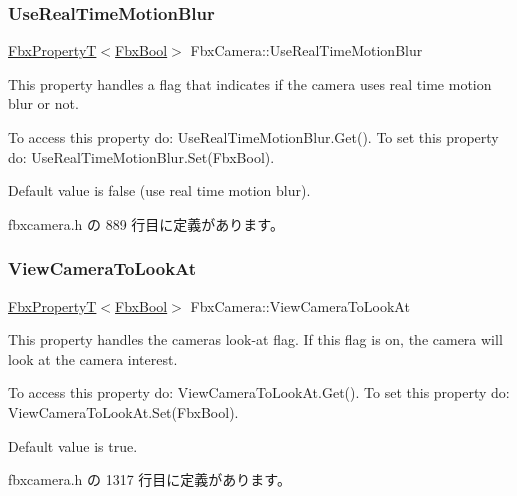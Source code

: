 \subsubsection{\texorpdfstring{Use\+Real\+Time\+Motion\+Blur}{UseRealTimeMotionBlur}}
{\footnotesize\ttfamily \hyperlink{class_fbx_property_t}{Fbx\+PropertyT}$<$\hyperlink{fbxtypes_8h_a92e0562b2fe33e76a242f498b362262e}{Fbx\+Bool}$>$ Fbx\+Camera\+::\+Use\+Real\+Time\+Motion\+Blur}

This property handles a flag that indicates if the camera uses real time motion blur or not.

To access this property do\+: Use\+Real\+Time\+Motion\+Blur.\+Get(). To set this property do\+: Use\+Real\+Time\+Motion\+Blur.\+Set(\+Fbx\+Bool).

Default value is false (use real time motion blur). 

 fbxcamera.\+h の 889 行目に定義があります。

\mbox{\label{class_fbx_camera_a9c44e5ed7154bb5b69664bbe4e7a7f51}} 
\subsubsection{\texorpdfstring{View\+Camera\+To\+Look\+At}{ViewCameraToLookAt}}
{\footnotesize\ttfamily \hyperlink{class_fbx_property_t}{Fbx\+PropertyT}$<$\hyperlink{fbxtypes_8h_a92e0562b2fe33e76a242f498b362262e}{Fbx\+Bool}$>$ Fbx\+Camera\+::\+View\+Camera\+To\+Look\+At}

This property handles the camera\textquotesingle{}s look-\/at flag. If this flag is on, the camera will look at the camera interest.

To access this property do\+: View\+Camera\+To\+Look\+At.\+Get(). To set this property do\+: View\+Camera\+To\+Look\+At.\+Set(\+Fbx\+Bool).

Default value is true. 

 fbxcamera.\+h の 1317 行目に定義があります。

\mbox{\label{class_fbx_camera_aee58e80280621397eccfaf92ac30e914}} 
